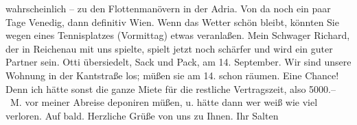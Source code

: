 \begin{ledgroupsized}[t]{13cm}
               wahrscheinlich – zu den Flottenmanövern in der Adria. Von da noch ein paar Tage Venedig, dann definitiv Wien. Wenn das
               Wetter schön bleibt, könnten Sie wegen eines Tennisplatzes (Vormittag) etwas
               veranlaßen. Mein Schwager Richard, der in Reichenau mit uns spielte, spielt jetzt noch
               schärfer und wird ein guter Partner sein. Otti
               übersiedelt, Sack und Pack, am 14. September. Wir sind unsere Wohnung in
               der Kantstraße los; müßen sie am 14. schon
               räumen. Eine Chance! Denn ich hätte sonst die ganze Miete für die restliche
               Vertragszeit, also 5000.– M. vor meiner Abreise deponiren müßen, u. hätte dann wer
               weiß wie viel verloren.\pend
           \pstart
           Auf bald.\pend
           \pstart Herzliche Grüße von uns zu Ihnen. Ihr \spacefill\mbox{Salten}\pend{}
         
         \endnumbering{}\end{ledgroupsized}\begin{anhang}\end{anhang}\newcommand{\dateiname}{L03433}\newcommand{\titel}{Felix Salten an Arthur Schnitzler, 23. 8. 1906}\newcommand{\editorInnen}{Martin Anton Müller und Laura Untner}
      